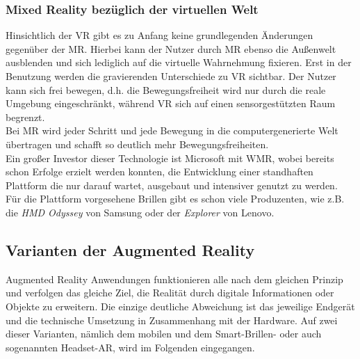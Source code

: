 \subsubsection*{Mixed Reality bezüglich der virtuellen Welt}
Hinsichtlich der \acs{VR} gibt es zu Anfang keine grundlegenden Änderungen gegenüber der \acs{MR}. Hierbei kann der Nutzer durch 
\acs{MR} ebenso die Außenwelt ausblenden und sich lediglich auf die virtuelle Wahrnehmung fixieren. Erst in der Benutzung werden die 
gravierenden Unterschiede zu \acs{VR} sichtbar. Der Nutzer kann sich frei bewegen, d.h. die Bewegungsfreiheit wird nur durch 
die reale Umgebung eingeschränkt, während \acl{VR} sich auf einen sensorgestützten Raum begrenzt. \cite{vr.2018n}
\\ 
Bei \acs{MR} wird jeder Schritt und jede Bewegung in die computergenerierte Welt übertragen und schafft so deutlich mehr Bewegungsfreiheiten.
\\ 
\linebreak 
Ein großer Investor dieser Technologie ist Microsoft mit \ac{WMR}, wobei bereits schon Erfolge erzielt werden konnten, die Entwicklung einer standhaften Plattform 
die nur darauf wartet, ausgebaut und intensiver genutzt zu werden. Für die Plattform vorgesehene Brillen gibt es schon viele Produzenten, wie z.B. 
die \textit{HMD Odyssey} von Samsung oder der \textit{Explorer} von Lenovo.

\subsection{Varianten der Augmented Reality}
\label{subchap:Varianten der AR}
Augmented Reality Anwendungen funktionieren alle nach dem gleichen Prinzip und verfolgen das gleiche Ziel, die Realität durch digitale Informationen 
oder Objekte zu erweitern. Die einzige deutliche Abweichung ist das jeweilige Endgerät und die technische Umsetzung in Zusammenhang mit der 
Hardware. Auf zwei dieser Varianten, nämlich dem mobilen und dem Smart-Brillen- oder auch sogenannten Headset-AR, wird im Folgenden 
eingegangen.

